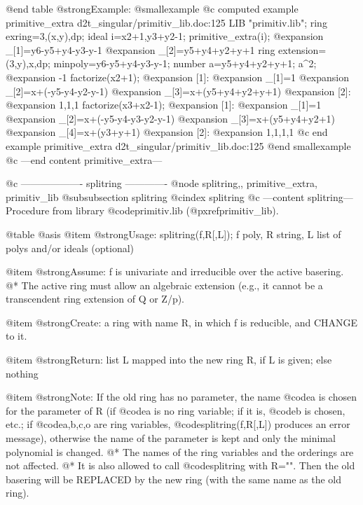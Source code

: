 @end table
@strong{Example:}
@smallexample
@c computed example primitive_extra d2t_singular/primitiv_lib.doc:125 
LIB "primitiv.lib";
ring exring=3,(x,y),dp;
ideal i=x2+1,y3+y2-1;
primitive_extra(i);
@expansion{} _[1]=y6-y5+y4-y3-y-1
@expansion{} _[2]=y5+y4+y2+y+1
ring extension=(3,y),x,dp;
minpoly=y6-y5+y4-y3-y-1;
number a=y5+y4+y2+y+1;
a^2;
@expansion{} -1
factorize(x2+1);
@expansion{} [1]:
@expansion{}    _[1]=1
@expansion{}    _[2]=x+(-y5-y4-y2-y-1)
@expansion{}    _[3]=x+(y5+y4+y2+y+1)
@expansion{} [2]:
@expansion{}    1,1,1
factorize(x3+x2-1);
@expansion{} [1]:
@expansion{}    _[1]=1
@expansion{}    _[2]=x+(-y5-y4-y3-y2-y-1)
@expansion{}    _[3]=x+(y5+y4+y2+1)
@expansion{}    _[4]=x+(y3+y+1)
@expansion{} [2]:
@expansion{}    1,1,1,1
@c end example primitive_extra d2t_singular/primitiv_lib.doc:125
@end smallexample
@c ---end content primitive_extra---

@c ------------------- splitring -------------
@node splitring,, primitive_extra, primitiv_lib
@subsubsection splitring
@cindex splitring
@c ---content splitring---
Procedure from library @code{primitiv.lib} (@pxref{primitiv_lib}).

@table @asis
@item @strong{Usage:}
splitring(f,R[,L]); f poly, R string, L list of polys and/or ideals
(optional)

@item @strong{Assume:}
f is univariate and irreducible over the active basering. @*
The active ring must allow an algebraic extension (e.g., it cannot
be a transcendent ring extension of Q or Z/p).

@item @strong{Create:}
a ring with name R, in which f is reducible, and CHANGE to it.

@item @strong{Return:}
list L mapped into the new ring R, if L is given; else nothing

@item @strong{Note:}
If the old ring has no parameter, the name @code{a} is chosen for the
parameter of R (if @code{a} is no ring variable; if it is, @code{b} is
chosen, etc.; if @code{a,b,c,o} are ring variables,
@code{splitring(f,R[,L])} produces an error message), otherwise the
name of the parameter is kept and only the minimal polynomial is
changed. @*
The names of the ring variables and the orderings are not affected. @*
It is also allowed to call @code{splitring} with R="".
Then the old basering will be REPLACED by the new ring (with the
same name as the old ring).

